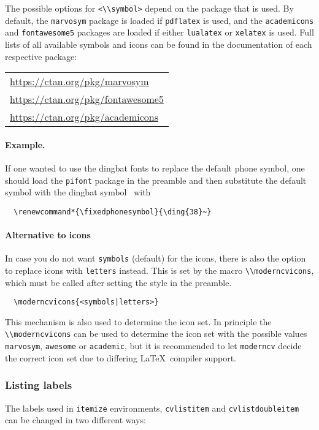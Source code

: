 \documentclass[a4paper, 11pt]{article}
\newcommand{\code}[1]{\lstinline!#1!}
\newcommand{\moderncv}{\code{moderncv}}
\newcommand{\Latex}{\LaTeX~}
\begin{document}
The possible options for \code{<\\symbol>} depend on the package that is used.
By default, the \code{marvosym} package is loaded if \code{pdflatex} is used, and the \code{academicons} and \code{fontawesome5} packages are loaded if either \code{lualatex} or \code{xelatex} is used.
Full lists of all available symbols and icons can be found in the documentation of each respective package:

\begin{tabular}{l}
  \url{https://ctan.org/pkg/marvosym} \\[1ex]
  \url{https://ctan.org/pkg/fontawesome5} \\[1ex]
  \url{https://ctan.org/pkg/academicons}
\end{tabular}

\paragraph{Example.}
If one wanted to use the dingbat fonts to replace the default phone symbol, one should load the \code{pifont} package in the preamble and then substitute the default symbol with the dingbat symbol \ with
\begin{lstlisting}
  \renewcommand*{\fixedphonesymbol}{\ding{38}~}
\end{lstlisting}

\paragraph{Alternative to icons}
In case you do not want \texttt{symbols} (default) for the icons, there is also the option to replace icons with \texttt{letters} instead. This is set by the macro \code{\\moderncvicons}, which must be called after setting the style in the preamble.
\begin{lstlisting}
  \moderncvicons{<symbols|letters>}
\end{lstlisting}
This mechanism is also used to determine the icon set. In principle the \code{\\moderncvicons} can be used to determine the icon set with the possible values \texttt{marvosym}, \texttt{awesome} or \texttt{academic}, but it is recommended to let {\moderncv} decide the correct icon set due to differing \Latex compiler support.

\subsubsection{Listing labels}
The labels used in \code{itemize} environments, \code{cvlistitem} and \code{cvlistdoubleitem} can be changed in two different ways:
\end{document}
